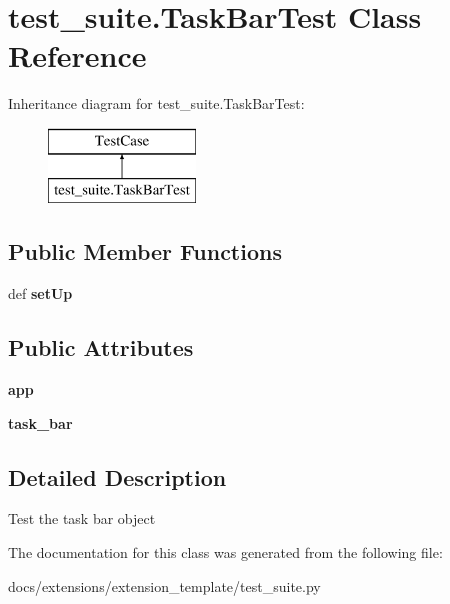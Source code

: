 \hypertarget{classtest__suite_1_1TaskBarTest}{\section{test\-\_\-suite.\-Task\-Bar\-Test Class Reference}
\label{classtest__suite_1_1TaskBarTest}
}
Inheritance diagram for test\-\_\-suite.\-Task\-Bar\-Test\-:\begin{figure}[H]
\begin{center}
\leavevmode
\includegraphics[height=2.000000cm]{classtest__suite_1_1TaskBarTest}
\end{center}
\end{figure}
\subsection*{Public Member Functions}
\begin{DoxyCompactItemize}
\item 
\hypertarget{classtest__suite_1_1TaskBarTest_a4fb9a558b494482ea7a27aba20cac5c7}{def {\bfseries set\-Up}}\label{classtest__suite_1_1TaskBarTest_a4fb9a558b494482ea7a27aba20cac5c7}

\end{DoxyCompactItemize}
\subsection*{Public Attributes}
\begin{DoxyCompactItemize}
\item 
\hypertarget{classtest__suite_1_1TaskBarTest_ad53e0ba8e35387cfb615483b7f898972}{{\bfseries app}}\label{classtest__suite_1_1TaskBarTest_ad53e0ba8e35387cfb615483b7f898972}

\item 
\hypertarget{classtest__suite_1_1TaskBarTest_a65d36a754a8278c6c572b32d92628686}{{\bfseries task\-\_\-bar}}\label{classtest__suite_1_1TaskBarTest_a65d36a754a8278c6c572b32d92628686}

\end{DoxyCompactItemize}


\subsection{Detailed Description}
\begin{DoxyVerb}Test the task bar object
\end{DoxyVerb}
 

The documentation for this class was generated from the following file\-:\begin{DoxyCompactItemize}
\item 
docs/extensions/extension\-\_\-template/test\-\_\-suite.\-py\end{DoxyCompactItemize}
